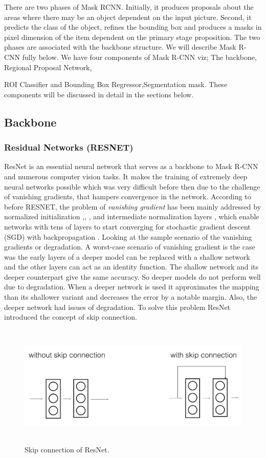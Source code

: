 There are two phases of Mask RCNN. Initially, it produces proposals about the areas where there may be an object dependent on the input picture. Second, it predicts the class of the object, refines the bounding box and produces a masks in pixel dimension of the item dependent on the primary stage proposition. The two phases are associated with the backbone structure. We will describe Mask R-CNN fully below. We have four components of Mask R-CNN viz; The backbone, Regional Proposal Network,{ROI Classifier and Bounding Box Regressor,Segmentation mask. These components will be discussed in detail in the sections below.
\subsection{Backbone}
\subsubsection{Residual Networks (RESNET)}
ResNet is an essential neural network that serves as a backbone to Mask R-CNN and numerous computer vision tasks. 
It makes the training of extremely deep neural networks possible which was very difficult before then due to the 
challenge of vanishing gradients, that hampers convergence in the network. According to \protect\cite{M} before RESNET, the problem 
of \textit{vanishing gradient} has been mainly addressed by normalized initialization \protect\cite{N},\protect\cite{O}, \protect\cite{P}, \protect\cite{Q} and intermediate 
normalization layers \protect\cite{R}, which enable networks with tens of layers to start converging for stochastic gradient descent 
(SGD) with backpropagation \protect\cite{S}.
Looking at the sample scenario of the vanishing gradients or degradation. A worst-case scenario of vanishing gradient is
 the case was the early layers of a deeper model can be replaced with a shallow network and the other layers can act as an identity function.  The shallow network and its deeper counterpart give the same accuracy. So deeper models do not perform well due to degradation. When a deeper network is used it approximates the mapping than its shallower variant and decreases the error by a notable margin. 
 Also, the deeper network had issues of degradation.
To solve this problem ResNet introduced the concept of skip connection.

\begin{figure}[H]
 \centering
 \includegraphics[height=2.3in]{images/skipconnection.jpg}
 \caption{Skip connection of ResNet.}
\end{figure}

}
